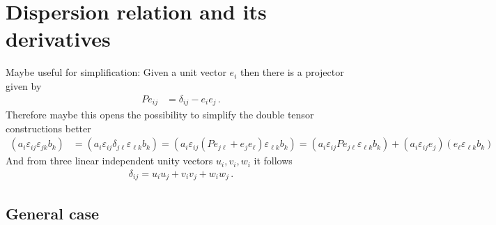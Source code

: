 \documentclass[12pt,a4paper,twoside,openright,BCOR10mm,headsepline,titlepage,abstracton,chapterprefix,final]{scrreprt}
\newcommand{\eps}[1]{\varepsilon_{#1}}
\begin{document}
\section{Dispersion relation and its derivatives}

Maybe useful for simplification: Given a unit vector $e_i$ then there is a projector given by
\begin{align}
 Pe_{ij} &= \delta_{ij} - e_i e_j\,.
\end{align}
Therefore maybe this opens the possibility to simplify the double tensor constructions better
\begin{align}
 (a_i \eps{ij} \eps{jk} b_k) &= (a_i \eps{ij} \delta_{j\ell} \eps{\ell k} b_k) 
= (a_i \eps{ij} (Pe_{j\ell} + e_j e_\ell) \eps{\ell k} b_k) = (a_i \eps{ij} Pe_{j\ell} \eps{\ell k} b_k) + (a_i \eps{ij} e_j)(e_\ell \eps{\ell k} b_k)
\end{align}
And from three linear independent unity vectors $u_i, v_i, w_i$ it follows
\begin{align}
 \delta_{ij} = u_i u_j + v_i v_j + w_i w_j\,.
\end{align}



\subsection{General case}
\end{document}
